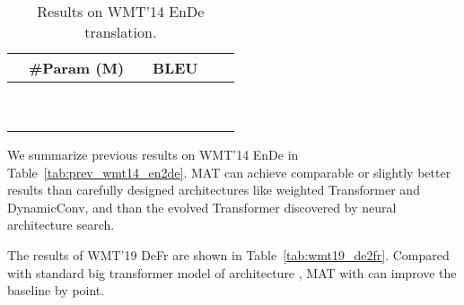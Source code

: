 \documentclass{article}
\begin{document}
\begin{table}[!htbp]
\vspace{-2mm}
\centering
\caption{Results on WMT'14 EnDe translation. }
\begin{tabular}{lccccc}
\toprule
 & \#Param (M) &  & BLEU \\
\midrule
 &  &  &   \\
 &  &  &  \\
 &  &  &  \\
\midrule
 &  &  & \\
 &  &  &   \\
 &  &  &   \\
 &  &  &   \\
 &  &  &   \\
 &  &  &   \\
\bottomrule
\end{tabular}
\label{tab:wmt14_en2de}
\vspace{-1mm}
\end{table}

We summarize previous results on WMT'14 EnDe in Table~\ref{tab:prev_wmt14_en2de}. MAT can achieve comparable or slightly better results than carefully designed architectures like weighted Transformer and DynamicConv, and than the evolved Transformer discovered by neural architecture search.

The results of WMT'19 DeFr are shown in Table~\ref{tab:wmt19_de2fr}. Compared with standard big transformer model of architecture , MAT with  can improve the baseline by  point.
\end{document}
